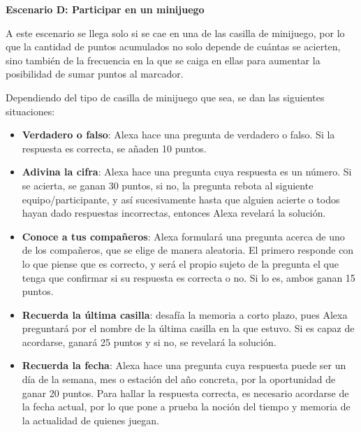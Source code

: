 \vspace{0.5cm}
\textbf{Escenario D: Participar en un minijuego}

A este escenario se llega solo si se cae en una de las casilla de minijuego, por lo que la cantidad de puntos acumulados no solo depende de cuántas se acierten, sino también de la frecuencia en la que se caiga en ellas para aumentar la posibilidad de sumar puntos al marcador.

Dependiendo del tipo de casilla de minijuego que sea, se dan las siguientes situaciones:
\begin{itemize}
	\item \textbf{Verdadero o falso}: Alexa hace una pregunta de verdadero o falso. Si la respuesta es correcta, se añaden 10 puntos.
	\item \textbf{Adivina la cifra}: Alexa hace una pregunta cuya respuesta es un número. Si se acierta, se ganan 30 puntos, si no, la pregunta rebota al siguiente equipo/participante, y así sucesivamente hasta que alguien acierte o todos hayan dado respuestas incorrectas, entonces Alexa revelará la solución.
	\item \textbf{Conoce a tus compañeros}: Alexa formulará una pregunta acerca de uno de los compañeros, que se elige de manera aleatoria. El primero responde con lo que piense que es correcto, y será el propio sujeto de la pregunta el que tenga que confirmar si su respuesta es correcta o no. Si lo es, ambos ganan 15 puntos.
	\item \textbf{Recuerda la última casilla}: desafía la memoria a corto plazo, pues Alexa preguntará por el nombre de la última casilla en la que estuvo. Si es capaz de acordarse, ganará 25 puntos y si no, se revelará la solución.
	\item \textbf{Recuerda la fecha}: Alexa hace una pregunta cuya respuesta puede ser un día de la semana, mes o estación del año concreta, por la oportunidad de ganar 20 puntos. Para hallar la respuesta correcta, es necesario acordarse de la fecha actual, por lo que pone a prueba la noción del tiempo y memoria de la actualidad de quienes juegan.
\end{itemize}

